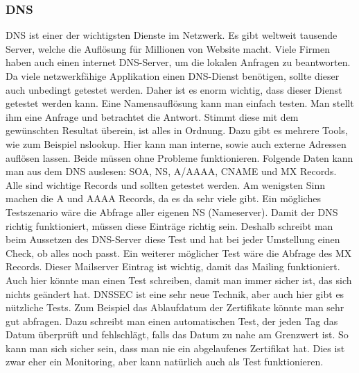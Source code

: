 \documentclass[a4,12pt]{scrartcl}
\begin{document}
\subsubsection{DNS}
DNS ist einer der wichtigsten Dienste im Netzwerk. Es gibt weltweit tausende Server, welche die Auflösung für Millionen von Website macht. Viele Firmen haben auch einen internet DNS-Server, um die lokalen Anfragen zu beantworten. Da viele netzwerkfähige Applikation einen DNS-Dienst benötigen, sollte dieser auch unbedingt getestet werden. Daher ist es enorm wichtig, dass dieser Dienst getestet werden kann.\newline\newline
Eine Namensauflösung kann man einfach testen. Man stellt ihm eine Anfrage und betrachtet die Antwort. Stimmt diese mit dem gewünschten Resultat überein, ist alles in Ordnung. Dazu gibt es mehrere Tools, wie zum Beispiel nslookup. Hier kann man interne, sowie auch externe Adressen auflösen lassen. Beide müssen ohne Probleme funktionieren.\newline\newline
Folgende Daten kann man aus dem DNS auslesen: SOA, NS, A/AAAA, CNAME und MX Records. Alle sind wichtige Records und sollten getestet werden. Am wenigsten Sinn machen die A und AAAA Records, da es da sehr viele gibt.\newline\newline
Ein mögliches Testszenario wäre die Abfrage aller eigenen NS (Nameserver). Damit der DNS richtig funktioniert, müssen diese Einträge richtig sein. Deshalb schreibt man beim Aussetzen des DNS-Server diese Test und hat bei jeder Umstellung einen Check, ob alles noch passt. Ein weiterer möglicher Test wäre die Abfrage des MX Records. Dieser Mailserver Eintrag ist wichtig, damit das Mailing funktioniert. Auch hier könnte man einen Test schreiben, damit man immer sicher ist, das sich nichts geändert hat.\newline\newline
DNSSEC ist eine sehr neue Technik, aber auch hier gibt es nützliche Tests. Zum Beispiel das Ablaufdatum der Zertifikate könnte man sehr gut abfragen. Dazu schreibt man einen automatischen Test, der jeden Tag das Datum überprüft und fehlschlägt, falls das Datum zu nahe am Grenzwert ist. So kann man sich sicher sein, dass man nie ein abgelaufenes Zertifikat hat. Dies ist zwar eher ein Monitoring, aber kann natürlich auch als Test funktionieren.
\end{document}
